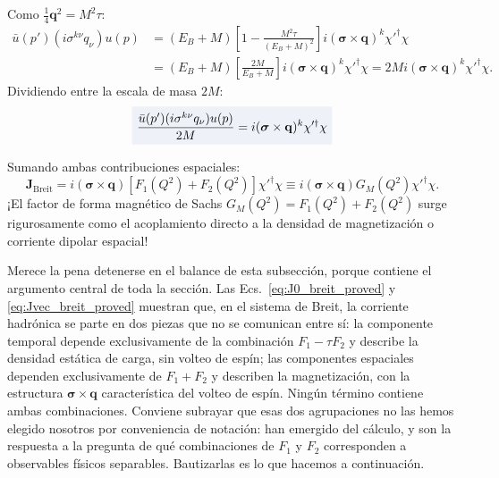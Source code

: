 \documentclass[10pt,a4paper]{article}
\newcommand{\dest}[1]{{\setlength{\fboxsep}{4pt}\colorbox{colordest}{$\displaystyle #1$}}}
\begin{document}
Como $\frac{1}{4}\mathbf{q}^2 = M^2 \tau$:
\begin{align}
\bar{u}(p') (i \sigma^{k\nu} q_\nu) u(p) &= (E_B + M) \left[ 1 - \frac{M^2 \tau}{(E_B + M)^2} \right] i (\boldsymbol{\sigma} \times \mathbf{q})^k \chi'^\dagger \chi \nonumber \\
&= (E_B + M) \left[ \frac{2M}{E_B + M} \right] i (\boldsymbol{\sigma} \times \mathbf{q})^k \chi'^\dagger \chi = 2 M i (\boldsymbol{\sigma} \times \mathbf{q})^k \chi'^\dagger \chi.
\end{align}
Dividiendo entre la escala de masa $2M$:
\begin{equation}
\dest{\frac{\bar{u}(p') (i \sigma^{k\nu} q_\nu) u(p)}{2M} = i (\boldsymbol{\sigma} \times \mathbf{q})^k \chi'^\dagger \chi}
\label{eq:breit_pauli_vec_exact}
\end{equation}

Sumando ambas contribuciones espaciales:
\begin{equation}
\mathbf{J}_{\text{Breit}} = i (\boldsymbol{\sigma} \times \mathbf{q}) \left[ F_1(Q^2) + F_2(Q^2) \right] \chi'^\dagger \chi \equiv i (\boldsymbol{\sigma} \times \mathbf{q}) G_M(Q^2) \chi'^\dagger \chi.
\label{eq:Jvec_breit_proved}
\end{equation}
¡El factor de forma magnético de Sachs $G_M(Q^2) = F_1(Q^2) + F_2(Q^2)$ surge rigurosamente como el acoplamiento directo a la densidad de magnetización o corriente dipolar espacial!

Merece la pena detenerse en el balance de esta subsección, porque contiene el argumento central de toda la sección. Las Ecs.~\eqref{eq:J0_breit_proved} y \eqref{eq:Jvec_breit_proved} muestran que, en el sistema de Breit, la corriente hadrónica se parte en dos piezas que no se comunican entre sí: la componente temporal depende exclusivamente de la combinación $F_1 - \tau F_2$ y describe la densidad estática de carga, sin volteo de espín; las componentes espaciales dependen exclusivamente de $F_1 + F_2$ y describen la magnetización, con la estructura $\boldsymbol{\sigma}\times\mathbf{q}$ característica del volteo de espín. Ningún término contiene ambas combinaciones. Conviene subrayar que esas dos agrupaciones no las hemos elegido nosotros por conveniencia de notación: han emergido del cálculo, y son la respuesta a la pregunta de qué combinaciones de $F_1$ y $F_2$ corresponden a observables físicos separables. Bautizarlas es lo que hacemos a continuación.
\end{document}
